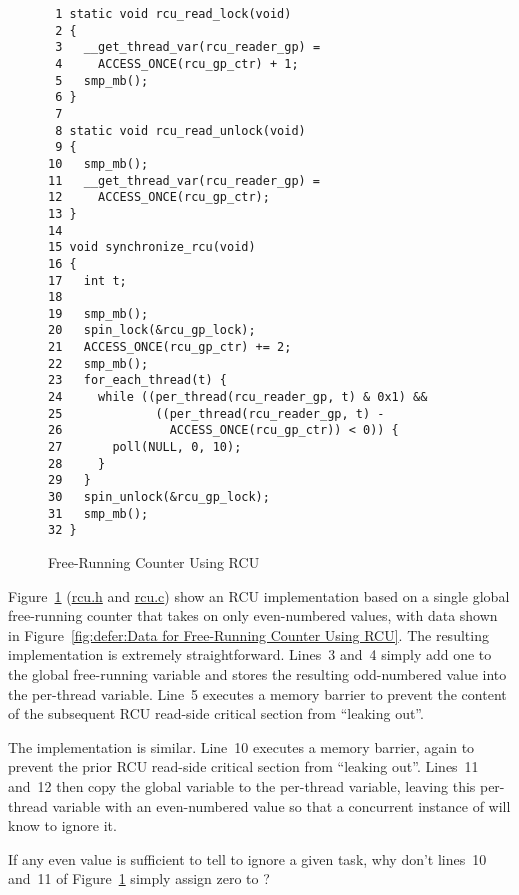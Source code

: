 \begin{figure}[tbp]
{ \scriptsize
\begin{verbatim}
 1 static void rcu_read_lock(void)
 2 {
 3   __get_thread_var(rcu_reader_gp) =
 4     ACCESS_ONCE(rcu_gp_ctr) + 1;
 5   smp_mb();
 6 }
 7 
 8 static void rcu_read_unlock(void)
 9 {
10   smp_mb();
11   __get_thread_var(rcu_reader_gp) =
12     ACCESS_ONCE(rcu_gp_ctr);
13 }
14 
15 void synchronize_rcu(void)
16 {
17   int t;
18 
19   smp_mb();
20   spin_lock(&rcu_gp_lock);
21   ACCESS_ONCE(rcu_gp_ctr) += 2;
22   smp_mb();
23   for_each_thread(t) {
24     while ((per_thread(rcu_reader_gp, t) & 0x1) &&
25             ((per_thread(rcu_reader_gp, t) -
26               ACCESS_ONCE(rcu_gp_ctr)) < 0)) {
27       poll(NULL, 0, 10);
28     }
29   }
30   spin_unlock(&rcu_gp_lock);
31   smp_mb();
32 }
\end{verbatim}
}
\caption{Free-Running Counter Using RCU}
\label{fig:defer:Free-Running Counter Using RCU}
\end{figure}

Figure~\ref{fig:defer:Free-Running Counter Using RCU}
(\url{rcu.h} and \url{rcu.c})
show an RCU implementation based on a single global free-running counter
that takes on only even-numbered values, with data shown in
Figure~\ref{fig:defer:Data for Free-Running Counter Using RCU}.
The resulting  implementation is extremely
straightforward.
Lines~3 and~4 simply add one to the global free-running 
variable and stores the resulting odd-numbered value into the
 per-thread variable.
Line~5 executes a memory barrier to prevent the content of the
subsequent RCU read-side critical section from ``leaking out''.

The  implementation is similar.
Line~10 executes a memory barrier, again to prevent the prior RCU
read-side critical section from ``leaking out''.
Lines~11 and~12 then copy the  global variable to the
 per-thread variable, leaving this per-thread
variable with an even-numbered value so that a concurrent instance
of  will know to ignore it.

\QuickQuiz{}
	If any even value is sufficient to tell 
	to ignore a given task, why don't lines~10 and~11 of
	Figure~\ref{fig:defer:Free-Running Counter Using RCU}
	simply assign zero to ?
 \QuickQuizEnd

